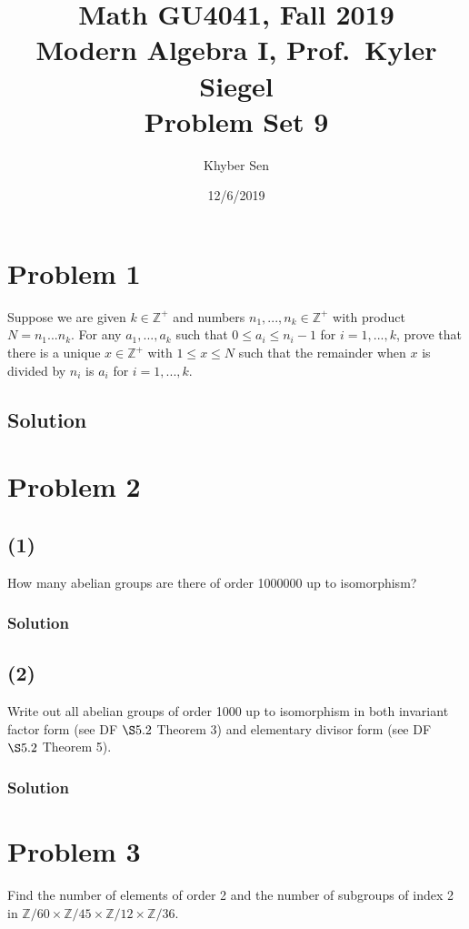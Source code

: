 \documentclass[fleqn]{article}
\title{
Math GU4041, Fall 2019 \\
Modern Algebra I, Prof.\ Kyler Siegel \\
Problem Set 9
}
\author{Khyber Sen}
\date{12/6/2019}
\begin{document}
    
    \maketitle
    
    \section{Problem 1}
    Suppose we are given $k \in \mathbb{Z}^+$ and numbers $n_1, ..., n_k \in \mathbb{Z}^+$ with product $N = n_1 ... n_k$.  For any $a_1, ..., a_k$ such that $0 \leq a_i \leq n_i - 1$ for $i = 1, ..., k$, prove that there is a unique $x \in \mathbb{Z}^+$ with $1 \leq x \leq N$ such that the remainder when $x$ is divided by $n_i$ is $a_i$ for $i = 1, ..., k$.
        
        \subsection{Solution}
        
    
    \section{Problem 2}
        
        \subsection{(1)}
        How many abelian groups are there of order 1000000 up to isomorphism?
            
            \subsubsection{Solution}
            
        
        \subsection{(2)}
        Write out all abelian groups of order 1000 up to isomorphism in both invariant factor form (see DF $\S5.2$ Theorem 3) and elementary divisor form (see DF $\S5.2$ Theorem 5).
        
            \subsubsection{Solution}
            
    
    \section{Problem 3}
    Find the number of elements of order 2 and the number of subgroups of index 2 in $\mathbb{Z}/60 \times \mathbb{Z}/45 \times \mathbb{Z}/12 \times \mathbb{Z}/36$.
        
\end{document}
